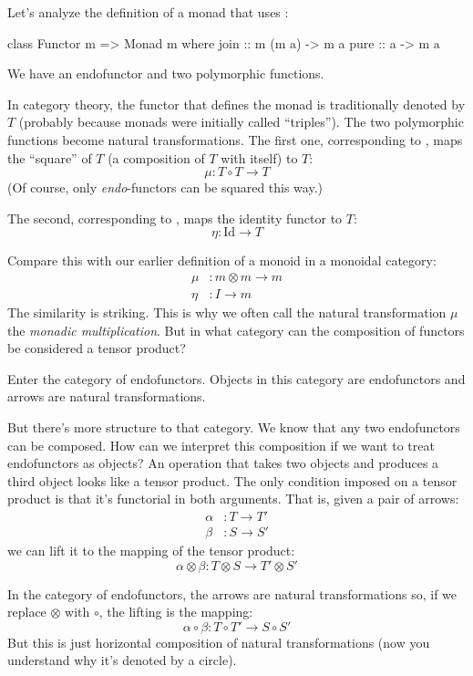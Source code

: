\documentclass[DaoFP]{subfiles}
\begin{document}
Let's analyze the definition of a monad that uses :
\begin{haskell}
class Functor m => Monad m where
  join :: m (m a) -> m a
  pure :: a -> m a
\end{haskell}
We have an endofunctor  and two polymorphic functions. 

In category theory, the functor that defines the monad is traditionally denoted by $T$ (probably because monads were initially called ``triples''). The two polymorphic functions become natural transformations. The first one, corresponding to , maps the ``square'' of $T$ (a composition of $T$ with itself) to $T$:
\[ \mu \colon T \circ T \to T \]
(Of course, only \emph{endo}-functors can be squared this way.) 

The second, corresponding to , maps the identity functor to $T$:
\[ \eta \colon \text{Id} \to T \]

Compare this with our earlier definition of a monoid in a monoidal category:
\begin{align*}
\mu &\colon m \otimes m \to m \\
\eta &\colon I \to m
\end{align*}
The similarity is striking. This is why we often call the natural transformation $\mu$ the \emph{monadic multiplication}. But in what category can the composition of functors be considered a tensor product? 

Enter the category of endofunctors. Objects in this category are endofunctors and arrows are natural transformations. 

But there's more structure to that category. We know that any two endofunctors can be composed. How can we interpret this composition if we want to treat endofunctors as objects? An operation that takes two objects and produces a third object looks like a tensor product.  The only condition imposed on a tensor product is that it's functorial in both arguments. That is, given a pair of arrows:
\begin{align*}
 \alpha &\colon T \to T' \\
 \beta &\colon S \to S' 
\end{align*}
 we can lift it to the mapping of the tensor product:
 \[ \alpha \otimes \beta \colon T \otimes S \to T' \otimes S' \]
 
 In the category of endofunctors, the arrows are natural transformations so, if we replace $\otimes$ with $\circ$, the lifting is the mapping:
\[ \alpha \circ \beta \colon T \circ T' \to S \circ S' \]
But this is just horizontal composition of natural transformations (now you understand why it's denoted by a circle).
\end{document}

